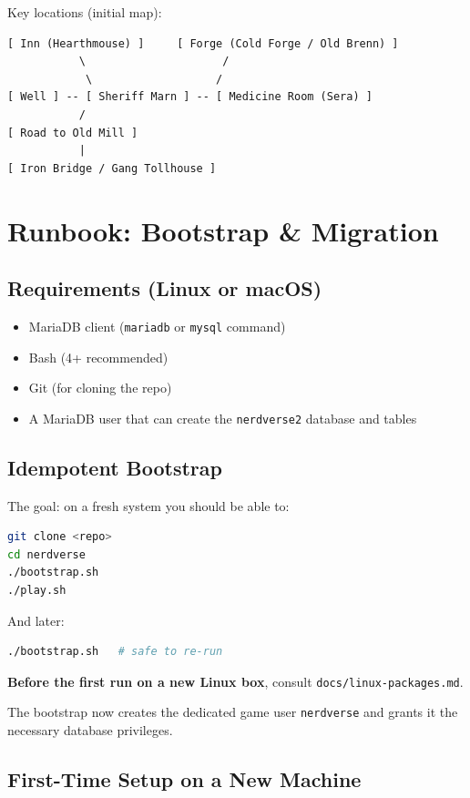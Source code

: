 \documentclass[11pt,a4paper]{article}
\begin{document}
Key locations (initial map):
\begin{verbatim}
[ Inn (Hearthmouse) ]     [ Forge (Cold Forge / Old Brenn) ]
           \                     /
            \                   /
[ Well ] -- [ Sheriff Marn ] -- [ Medicine Room (Sera) ]
           /
[ Road to Old Mill ]
           |
[ Iron Bridge / Gang Tollhouse ]
\end{verbatim}

\section{Runbook: Bootstrap \& Migration}

\subsection{Requirements (Linux or macOS)}

\begin{itemize}
  \item MariaDB client (\texttt{mariadb} or \texttt{mysql} command)
  \item Bash (4+ recommended)
  \item Git (for cloning the repo)
  \item A MariaDB user that can create the \texttt{nerdverse2} database and tables
\end{itemize}

\subsection{Idempotent Bootstrap}

The goal: on a fresh system you should be able to:

\begin{lstlisting}[language=bash]
git clone <repo>
cd nerdverse
./bootstrap.sh
./play.sh
\end{lstlisting}

And later:

\begin{lstlisting}[language=bash]
./bootstrap.sh   # safe to re-run
\end{lstlisting}

\textbf{Before the first run on a new Linux box}, consult \texttt{docs/linux-packages.md}.

The bootstrap now creates the dedicated game user \texttt{nerdverse} and grants it the necessary database privileges.

\subsection{First-Time Setup on a New Machine}
\end{document}
